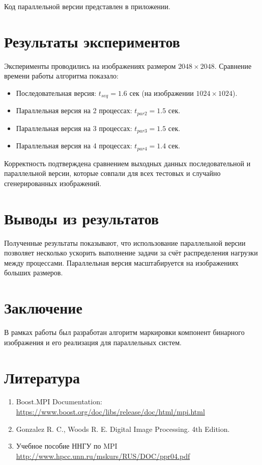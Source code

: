 \documentclass[a4paper,12pt]{article}
\begin{document}
Код параллельной версии представлен в приложении.


\section{Результаты экспериментов}
Эксперименты проводились на изображениях размером $2048 \times 2048$. Сравнение времени работы алгоритма показало:
\begin{itemize}
    \item Последовательная версия: $t_{seq} = 1.6$ сек (на изображении $1024 \times 1024$).
    \item Параллельная версия на 2 процессах: $t_{par2} = 1.5$ сек.
    \item Параллельная версия на 3 процессах: $t_{par3} = 1.5$ сек.
    \item Параллельная версия на 4 процессах: $t_{par4} = 1.4$ сек.
\end{itemize}
Корректность подтверждена сравнением выходных данных последовательной и параллельной версии, которые совпали для всех тестовых и случайно сгенерированных изображений.
\section{Выводы из результатов}
Полученные результаты показывают, что использование параллельной версии позволяет несколько ускорить выполнение задачи за счёт распределения нагрузки между процессами. Параллельная версия масштабируется на изображениях больших размеров.

\section{Заключение}
В рамках работы был разработан алгоритм маркировки компонент бинарного изображения и его реализация для параллельных систем.
\newpage
\section{Литература}
\begin{enumerate}
    \item Boost.MPI Documentation: \url{https://www.boost.org/doc/libs/release/doc/html/mpi.html}
    \item Gonzalez R. C., Woods R. E. Digital Image Processing. 4th Edition.
    \item  Учебное пособие ННГУ по MPI \url{http://www.hpcc.unn.ru/mskurs/RUS/DOC/ppr04.pdf}

\end{enumerate}
\newpage
\end{document}
